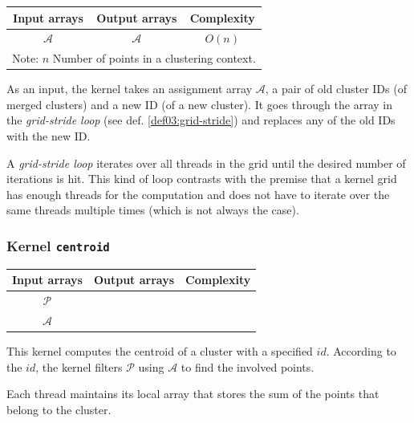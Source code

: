 \begin{table}[h]
	\centering
	\begin{tabular}{ccc}
		\toprule
		\textbf{Input arrays} & \textbf{Output arrays} & \textbf{Complexity} \\ \midrule
		    $\mathcal{A}$     &     $\mathcal{A}$      &       $O(n)$        \\ \bottomrule
		    \multicolumn{3}{l}{\footnotesize Note: $n$ Number of points in a clustering context.}
	\end{tabular}
\end{table}

As an input, the kernel takes an assignment array $\mathcal{A}$, a pair of old cluster IDs (of merged clusters) and a new ID (of a new cluster). It goes through the array in the \emph{grid-stride loop} (see def. \ref{def03:grid-stride}) and replaces any of the old IDs with the new ID.

\begin{defn}
	A \emph{grid-stride loop} iterates over all threads in the grid until the desired number of iterations is hit. This kind of loop contrasts with the premise that a kernel grid has enough threads for the computation and does not have to iterate over the same threads multiple times (which is not always the case). 
	\label{def03:grid-stride}
\end{defn}

\subsubsection{Kernel \texttt{centroid}}

\begin{table}[h]
	\centering
	\begin{tabular}{ccc}
		\toprule
		\textbf{Input arrays} & \textbf{Output arrays} & \textbf{Complexity} \\ \midrule
		    $\mathcal{P}$     &                        &                     \\
		    $\mathcal{A}$     & \pulrad{$\mathcal{C}$} &   \pulrad{$O(n)$}   \\ \bottomrule 
	\end{tabular}
\end{table}

This kernel computes the centroid of a cluster with a specified $id$. According to the $id$, the kernel filters $\mathcal{P}$ using $\mathcal{A}$ to find the involved points.

Each thread maintains its local array that stores the sum of the points that belong to the cluster. 

